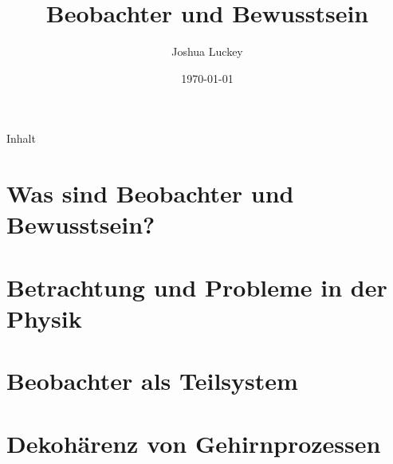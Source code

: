 
\newcommand{\Quote}[1]{\enquote{\emph{#1}}}
\newcommand{\altemph}[2]{\alt<#2>{\bfseries#1}{#1}}

\linespread{1.1}


\makeatletter
\def\beamer@framenotesbegin{%
	\gdef\beamer@noteitems{}%
	\gdef\beamer@notes{{}}%
}
\makeatother



\title{Beobachter und Bewusstsein}
\date{\today}
\author{Joshua Luckey}


	
	\maketitle
	
	
	\begin{frame}{Inhalt}
		\tableofcontents%
	\end{frame}
	
	
	\section{Was sind Beobachter und Bewusstsein?}
		\separatorslide
		
		
	
	\section{Betrachtung und Probleme in der Physik}
		\separatorslide
		
		
		
	\section{Beobachter als Teilsystem}
		\separatorslide
		
		
		
		
		
		
		
	\section{Dekohärenz von Gehirnprozessen}
		\separatorslide
		
		
				
